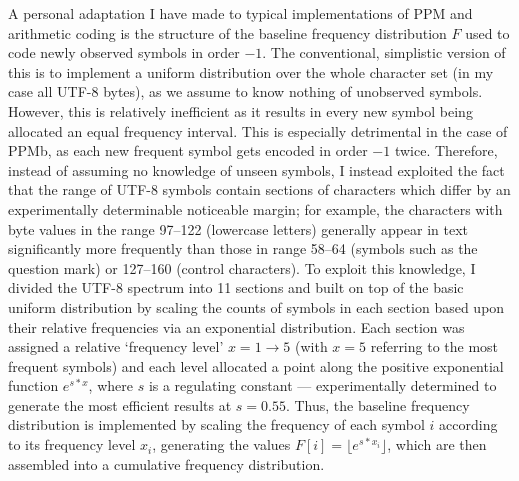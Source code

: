 \documentclass[a4paper, 11pt]{article}
\begin{document}
A personal adaptation I have made to typical implementations of PPM and arithmetic coding is the structure of the baseline frequency distribution $F$ used to code newly observed symbols in order $-1$. The conventional, simplistic version of this is to implement a uniform distribution over the whole character set (in my case all UTF-8 bytes), as we assume to know nothing of unobserved symbols. However, this is relatively inefficient as it results in every new symbol being allocated an equal frequency interval. This is especially detrimental in the case of PPMb, as each new frequent symbol gets encoded in order $-1$ twice. Therefore, instead of assuming no knowledge of unseen symbols, I instead exploited the fact that the range of UTF-8 symbols contain sections of characters which differ by an experimentally determinable noticeable margin; for example, the characters with byte values in the range 97--122 (lowercase letters) generally appear in text significantly more frequently than those in range 58--64 (symbols such as the question mark) or 127--160 (control characters). To exploit this knowledge, I divided the UTF-8 spectrum into 11 sections and built on top of the basic uniform distribution by scaling the counts of symbols in each section based upon their relative frequencies via an exponential distribution. Each section was assigned a relative ‘frequency level’ $x = 1 \to 5$ (with $x=5$ referring to the most frequent symbols) and each level allocated a point along the positive exponential function $e^{s * x}$, where $s$ is a regulating constant --- experimentally determined to generate the most efficient results at $s = 0.55$. Thus, the baseline frequency distribution is implemented by scaling the frequency of each symbol $i$ according to its frequency level $x_{i}$, generating the values $F[i] = \lfloor e^{s * x_{i}} \rfloor$, which are then assembled into a cumulative frequency distribution.
\end{document}
